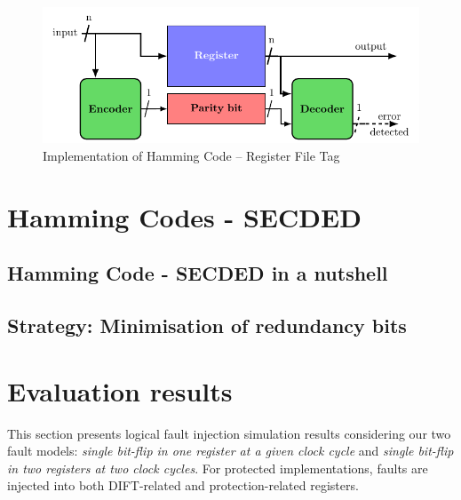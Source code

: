 \begin{figure}[ht]
    \centering
    \includegraphics[page=3, width=\textwidth]{c5_countermeasures_dift/img/archi_contremesures.pdf}
    \caption{Implementation of Hamming Code -- Register File Tag}
    \label{fig:implementation_hc_2}
\end{figure}


\section{Hamming Codes - SECDED}
\label{section:chap5_secded}


\subsection{Hamming Code - SECDED in a nutshell}


\subsection{Strategy: Minimisation of redundancy bits}


\section{Evaluation results}

This section presents logical fault injection simulation results considering our two fault models: \textit{single bit-flip in one register at a given clock cycle} and \textit{single bit-flip in two registers at two clock cycles}. For protected implementations, faults are injected into both DIFT-related and protection-related registers.

